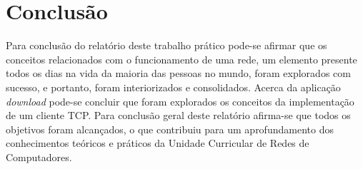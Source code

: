 \section*{Conclusão}
Para conclusão do relatório deste trabalho prático pode-se afirmar que os conceitos relacionados com o funcionamento de uma rede, um elemento presente todos os dias na vida da maioria das pessoas no mundo, foram explorados com sucesso, e portanto, foram interiorizados e consolidados.
\noindent Acerca da aplicação \emph{download} pode-se concluir que foram explorados os conceitos da implementação de um cliente TCP.
\noindent Para conclusão geral deste relatório afirma-se que todos os objetivos foram alcançados, o que contribuiu para um aprofundamento dos conhecimentos teóricos e práticos da Unidade Curricular de Redes de Computadores.